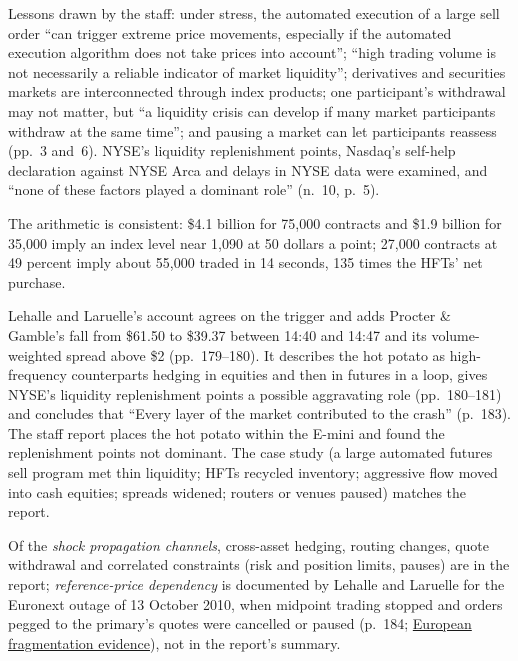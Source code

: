 \begin{qfevidence}
 Lessons drawn by the staff: under stress, the automated execution of a large sell order ``can trigger extreme price movements, especially if the automated execution algorithm does not take prices into account''; ``high trading volume is not necessarily a reliable indicator of market liquidity''; derivatives and securities markets are interconnected through index products; one participant's withdrawal may not matter, but ``a liquidity crisis can develop if many market participants withdraw at the same time''; and pausing a market can let participants reassess (pp.~3 and~6). NYSE's liquidity replenishment points, Nasdaq's self-help declaration against NYSE Arca and delays in NYSE data were examined, and ``none of these factors played a dominant role'' (n.~10, p.~5).

The arithmetic is consistent: \$4.1 billion for 75{,}000 contracts and \$1.9 billion for 35{,}000 imply an index level near 1{,}090 at 50 dollars a point; 27{,}000 contracts at 49 percent imply about 55{,}000 traded in 14 seconds, 135 times the HFTs' net purchase.

 Lehalle and Laruelle's account \citep[chap.~2, sec.~2.5.2, pp.~177--183]{alpha-laruelle} agrees on the trigger and adds Procter \& Gamble's fall from \$61.50 to \$39.37 between 14:40 and 14:47 and its volume-weighted spread above \$2 (pp.~179--180). It describes the hot potato as high-frequency counterparts hedging in equities and then in futures in a loop, gives NYSE's liquidity replenishment points a possible aggravating role (pp.~180--181) and concludes that ``Every layer of the market contributed to the crash'' (p.~183). The staff report places the hot potato within the E-mini and found the replenishment points not dominant. The case study (a large automated futures sell program met thin liquidity; HFTs recycled inventory; aggressive flow moved into cash equities; spreads widened; routers or venues paused) matches the report.

Of the \emph{shock propagation channels}, cross-asset hedging, routing changes, quote withdrawal and correlated constraints (risk and position limits, pauses) are in the report; \emph{reference-price dependency} is documented by Lehalle and Laruelle for the Euronext outage of 13 October 2010, when midpoint trading stopped and orders pegged to the primary's quotes were cancelled or paused (p.~184; \hyperref[ev:european-fragmentation-evidence]{European fragmentation evidence}), not in the report's summary.


\end{qfevidence}

